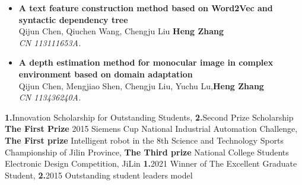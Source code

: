 \documentclass{resume}
\begin{document}
\begin{itemize}
\item \textbf{A text feature construction method based on Word2Vec and syntactic dependency tree}\quad {}\\
  \footnotesize{ Qijun Chen, Qiuchen Wang, Chengju Liu \textbf{Heng Zhang}}\\
  \footnotesize{\textit{ CN 113111653A.}}\\
  
\item \textbf{A depth estimation method for monocular image in complex environment based on domain adaptation}\quad {}\\
  \footnotesize{ Qijun Chen, Mengjiao Shen, Chengju Liu, Yuchu Lu,\textbf{Heng Zhang}}\\
  \footnotesize{\textit{ CN 113436240A.}}\\
       
\end{itemize}

\begin{competences}[6em]
  {
    \textbf{1.}Innovation Scholarship for Outstanding Students,
    \textbf{2.}Second Prize Scholarship
  }
  {%
    \textbf{The First Prize} 2015 Siemens Cup National Industrial Automation Challenge,
    \textbf{The First prize} Intelligent robot in the 8th Science and Technology Sports Championship of Jilin Province,
    \textbf{The Third prize} National College Students Electronic Design Competition, JiLin
  }
  {%
  \textbf{1.}2021 Winner of The Excellent Graduate Student,
  \textbf{2.}2015 Outstanding student leaders model
  }

\end{competences}
\end{document}
